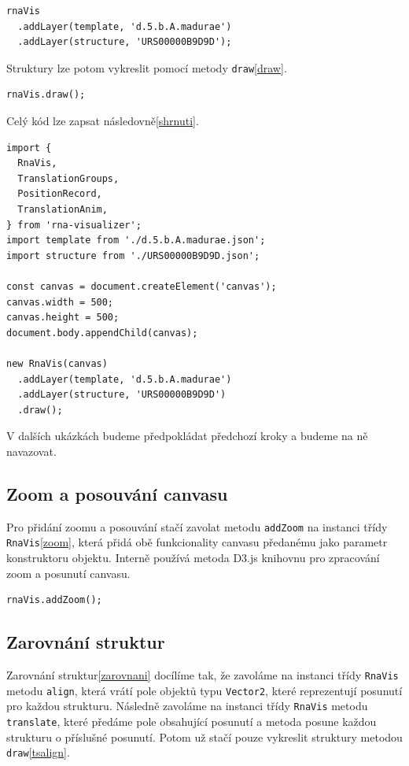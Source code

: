 \begin{lstlisting}[caption={Přidání struktur}, label=vrstvy]
rnaVis
  .addLayer(template, 'd.5.b.A.madurae')
  .addLayer(structure, 'URS00000B9D9D');
\end{lstlisting}

Struktury lze potom vykreslit pomocí metody \texttt{draw}\ref{draw}.

\begin{lstlisting}[caption={Vykreslení struktur}, label=draw]
rnaVis.draw();
\end{lstlisting}

Celý kód lze zapsat následovně\ref{shrnuti}.

\begin{lstlisting}[caption={Celý kód pohromadě}, label=shrnuti]
import { 
  RnaVis, 
  TranslationGroups, 
  PositionRecord,
  TranslationAnim,
} from 'rna-visualizer';
import template from './d.5.b.A.madurae.json';
import structure from './URS00000B9D9D.json';

const canvas = document.createElement('canvas');
canvas.width = 500;
canvas.height = 500;
document.body.appendChild(canvas);

new RnaVis(canvas)
  .addLayer(template, 'd.5.b.A.madurae')
  .addLayer(structure, 'URS00000B9D9D')
  .draw();
\end{lstlisting}

V dalších ukázkách budeme předpokládat předchozí kroky a budeme na ně
navazovat.

\subsection{Zoom a posouvání canvasu}

Pro přidání zoomu a posouvání stačí zavolat metodu \texttt{addZoom} na instanci
třídy \texttt{RnaVis}\ref{zoom}, která přidá obě funkcionality canvasu
předanému jako parametr konstruktoru objektu. Interně používá metoda D3.js
knihovnu pro zpracování zoom a posunutí canvasu.

\begin{lstlisting}[caption={Přidání zoom a posouvání}, label=zoom]
rnaVis.addZoom();
\end{lstlisting}

\subsection{Zarovnání struktur}

Zarovnání struktur\ref{zarovnani} docílíme tak, že zavoláme na instanci třídy \texttt{RnaVis}
metodu \texttt{align}, která vrátí pole objektů typu \texttt{Vector2}, které
reprezentují posunutí pro každou strukturu. Následně zavoláme na instanci třídy
\texttt{RnaVis} metodu \texttt{translate}, které předáme pole obsahující
posunutí a metoda posune každou strukturu o příslušné posunutí. Potom už stačí pouze vykreslit struktury metodou \texttt{draw}\ref{tsalign}.

